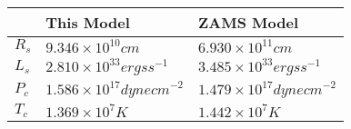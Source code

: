 
    \begin{tabular}{l|l|l}
    & This Model & ZAMS Model \\ \hline \hline
    $R_s$ & $9.346 \times 10^{10}\unit{cm}$ & $6.930 \times 10^{11}\unit{cm}$ \\
$L_s$ & $2.810 \times 10^{33}\unit{ergs s}^{-1}$ & $3.485 \times 10^{33}\unit{ergs s}^{-1}$ \\
$P_c$ & $1.586 \times 10^{17}\unit{dyne cm}^{-2}$ & $1.479 \times 10^{17}\unit{dyne cm}^{-2}$ \\
$T_c$ & $1.369 \times 10^{7}\unit{K}$ & $1.442 \times 10^{7}\unit{K}$ \\
    \end{tabular}
    